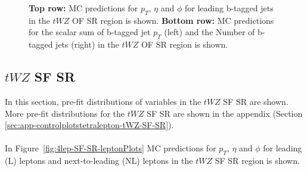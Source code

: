 \begin{figure}[htbp]
    \caption{\textbf{Top row:} MC predictions for $p_{T}$, $\eta$ and $\phi$ for leading b-tagged jets in the $tWZ$ OF SR region  is shown. \textbf{Bottom row:} MC predictions for the scalar sum of b-tagged jet $p_{T}$ (left) and the Number of b-tagged jets (right) in the $tWZ$ OF SR region  is shown.}
  \label{fig:4lep-OF-SR-bjetPlots}
\end{figure}


\subsection{$tWZ$ SF SR}
\label{sec:controlplotstetralepton-tWZ-SF-SR}


In this section, pre-fit distributions of variables in the $tWZ$ SF SR are shown. More pre-fit distributions for the $tWZ$ SF SR are shown in the appendix (Section \ref{sec:app-controlplotstetralepton-tWZ-SF-SR}).\\\\

In Figure~\ref{fig:4lep-SF-SR-leptonPlots} MC predictions for $p_{T}$, $\eta$ and $\phi$ for leading (L) leptons and next-to-leading (NL) leptons in the $tWZ$ SF SR region is shown.

